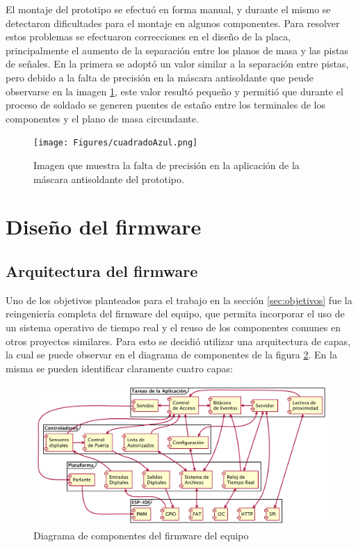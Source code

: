 El montaje del prototipo se efectuó en forma manual, y durante el mismo se detectaron dificultades para el montaje en algunos componentes. Para resolver estos problemas se efectuaron correcciones en el diseño de la placa, principalmente el aumento de la separación entre los planos de masa y las pistas de señales. En la primera se adoptó un valor similar a la separación entre pistas, pero debido a la falta de precisión en la máscara antisoldante que peude observarse en la imagen \ref{fig:ProblemasMascara}, este valor resultó pequeño y permitió que durante el proceso de soldado se generen puentes de estaño entre los terminales de los componentes y el plano de masa circundante.

\begin{figure}[ht]
	\centering
	\texttt{[image: Figures/cuadradoAzul.png]}
	\caption[Problemas con la  máscara antisoldante del prototipo]{Imagen que muestra la falta de precisión en la aplicación de la máscara antisoldante del prototipo.}
	\label{fig:ProblemasMascara}
\end{figure}

\section{Diseño del firmware}
\label{sec:firmware}

\subsection{Arquitectura del firmware}

Uno de los objetivos planteados para el trabajo en la sección \ref{sec:objetivos} fue la reingeniería completa del firmware del equipo, que permita incorporar el uso de un sistema operativo de tiempo real y el reuso de los componentes comunes en otros proyectos similares. Para esto se decidió utilizar una arquitectura de capas, la cual se puede observar en el diagrama de componentes de la figura \ref{fig:DiagramaComponentes}. En la misma se pueden identificar claramente cuatro capas:

\begin{figure}[ht]
	\centering
	\includegraphics[width=\textwidth]{./Figures/PNK-DC001.pdf}
	\caption{Diagrama de componentes del firmware del equipo}
	\label{fig:DiagramaComponentes}
\end{figure}

